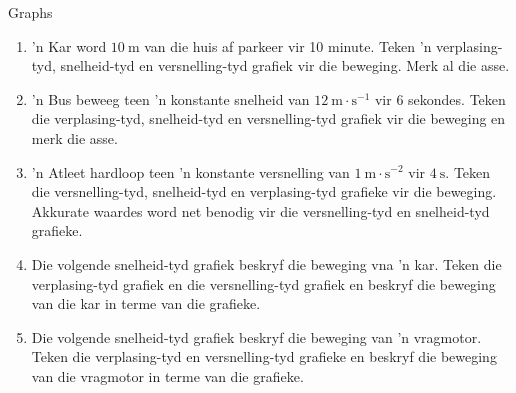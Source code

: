    \noindent
   \label{m38795*secfhsst!!!underscore!!!id3332}
\begin{exercises}{Graphs}
            \nopagebreak \noindent

\begin{enumerate}[noitemsep, label=\textbf{\arabic*}. ] 
    \item  'n Kar word $10~\text{m}$ van die huis af parkeer vir 10 minute. Teken  'n verplasing-tyd, snelheid-tyd en versnelling-tyd grafiek vir die beweging. Merk al die asse.

    \item  'n Bus beweeg teen  'n konstante snelheid van $12~\text{m}\ensuremath{\cdot}\text{s}{}^{-1}$ vir 6 sekondes. Teken die verplasing-tyd, snelheid-tyd en versnelling-tyd grafiek vir die beweging en merk die asse.

    \item  'n Atleet hardloop teen  'n konstante versnelling van $1~\text{m}\ensuremath{\cdot}\text{s}{}^{-2}$ vir $4~\text{s}$. Teken die versnelling-tyd, snelheid-tyd en verplasing-tyd grafieke vir die beweging. Akkurate waardes word net benodig vir die versnelling-tyd en snelheid-tyd grafieke. 

    \item Die volgende snelheid-tyd grafiek beskryf die beweging vna  'n kar. Teken die verplasing-tyd grafiek en die versnelling-tyd grafiek en beskryf die beweging van die kar in terme van die grafieke. 
\begin{figure}[H] %
\begin{center}
\end{center}

\end{figure}   

\item Die volgende snelheid-tyd grafiek beskryf die beweging van  'n vragmotor. Teken die verplasing-tyd en versnelling-tyd grafieke en beskryf die beweging van die vragmotor in terme van die grafieke.
\begin{figure}[H] %
\begin{center}
\end{center}
 \end{figure}               \end{enumerate}



\end{exercises}
